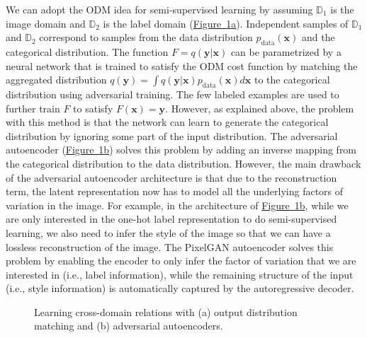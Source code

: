 \documentclass{article}
\newcommand{\myfigg}[2]{\hyperref[fig:#1]{Figure~\ref*{fig:#1}#2}}
\begin{document}
We can adopt the ODM idea for semi-supervised learning by assuming $\mathbb{D}_1$ is the image domain and $\mathbb{D}_2$ is the label domain (\myfigg{related}{a}). Independent samples of $\mathbb{D}_1$ and $\mathbb{D}_2$ correspond to samples from the data distribution $p_\text{data}(\mathbf{x})$ and the categorical distribution. The function $F = q(\mathbf{y}|\mathbf{x})$ can be parametrized by a neural network that is trained to satisfy the ODM cost function by matching the aggregated distribution $q(\mathbf{y}) = \int q(\mathbf{y}|\mathbf{x}) p_\text{data}(\mathbf{x}) d\mathbf{x}$ to the categorical distribution using adversarial training. The few labeled examples are used to further train $F$ to satisfy $F(\mathbf{x})=\mathbf{y}$. However, as explained above, the problem with this method is that the network can learn to generate the categorical distribution by ignoring some part of the input distribution. The adversarial autoencoder (\myfigg{related}{b}) solves this problem by adding an inverse mapping from the categorical distribution to the data distribution. However, the main drawback of the adversarial autoencoder architecture is that due to the reconstruction term, the latent representation now has to model all the underlying factors of variation in the image. For example, in the architecture of \myfigg{related}{b}, while we are only interested in the one-hot label representation to do semi-supervised learning, we also need to infer the style of the image so that we can have a lossless reconstruction of the image. The PixelGAN autoencoder solves this problem by enabling the encoder to only infer the factor of variation that we are interested in (i.e., label information), while the remaining structure of the input (i.e., style information) is automatically captured by the autoregressive decoder.

\begin{figure}[t]
\centering
{}
\hspace{1.5cm}
\vspace{-.3cm}
\caption{\label{fig:related}Learning cross-domain relations with (a) output distribution matching and (b) adversarial autoencoders.}
\end{figure}
\end{document}
